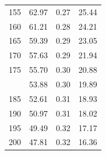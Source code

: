 \documentclass[12pt]{article}
\begin{document}
\begin{minipage}{0.5\textwidth}
\begin{tabular}{rccc}
    155 & 62.97 & 0.27 & 25.44 \\ 
    160 & 61.21 & 0.28 & 24.21 \\ 
    165 & 59.39 & 0.29 & 23.05 \\ 
    170 & 57.63 & 0.29 & 21.94 \\ 
    175 & 55.70 & 0.30 & 20.88 \\  \addlinespace
    180 & 53.88 & 0.30 & 19.89 \\ 
    185 & 52.61 & 0.31 & 18.93 \\ 
    190 & 50.97 & 0.31 & 18.02 \\ 
    195 & 49.49 & 0.32 & 17.17 \\ 
    200 & 47.81 & 0.32 & 16.36 \\ 

\bottomrule
\end{tabular}

\end{minipage} \hfill
\end{document}
